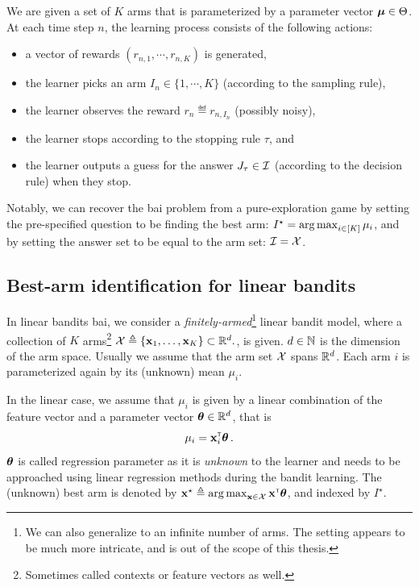 \begin{definition}\label{def:mab.pure}
\begin{leftbar}[defnbar]
	We are given a set of $K$ arms that is parameterized by a parameter vector ${\boldsymbol \mu}\in\Theta$. At each time step $n$, the learning process consists of the following actions:
\begin{itemize}
	\item a vector of rewards $(r_{n,1}, \cdots, r_{n,K})$ is generated,
	\item the learner picks an arm $I_n \in \{1,\cdots,K\}$ (according to the sampling rule),
	\item the learner observes the reward $r_n \eqdef r_{n,I_n}$ (possibly noisy),
	\item the learner stops according to the stopping rule $\tau$, and
	\item the learner outputs a guess for the answer $J_\tau \in \mathcal{I}$ (according to the decision rule) when they stop.
\end{itemize}
\end{leftbar}
\end{definition}

Notably, we can recover the \gls{bai} problem from a pure-exploration game by setting the pre-specified question to be finding the best arm: $I^\star = \operatorname*{arg\,max}_{i\in[K]}\mu_i$, and by setting the answer set to be equal to the arm set: $\mathcal{I} = \mathcal{X}$.

\subsection{Best-arm identification for linear bandits}\label{sec:mab.extensions.linear}

In linear bandits \gls{bai}, we consider a \emph{finitely-armed}\footnote{We can also generalize to an infinite number of arms. The setting appears to be much more intricate, and is out of the scope of this thesis.} linear bandit model, where a collection of $K$ arms\footnote{Sometimes called contexts or feature vectors as well.} $\mathcal{X}\triangleq\{{\bf x}_1,\ldots,{\bf x}_K\}\subset \mathbb{R}^d.$, is given. $d\in{\mathbb N}$ is the dimension of the arm space. Usually we assume that the arm set $\mathcal{X}$ spans $\mathbb{R}^d$. Each arm $i$ is parameterized again by its (unknown) mean $\mu_i$. 

In the linear case, we assume that $\mu_i$ is given by a linear combination of the feature vector and a parameter vector ${\boldsymbol \theta}\in\mathbb{R}^d$, that is 
\[
    \mu_i = {\bf x}_i^\mathsf{\scriptscriptstyle T}{\boldsymbol \theta}\,.
\]
${\boldsymbol \theta}$ is called regression parameter as it is \emph{unknown} to the learner and needs to be approached using linear regression methods during the bandit learning. The (unknown) best arm is denoted by ${\bf x}^\star\triangleq\operatorname*{arg\,max}_{{\bf x}\in\mathcal{X}}{\bf x}^\mathsf{\scriptscriptstyle T}{\boldsymbol \theta}$, and indexed by $I^\star$.

